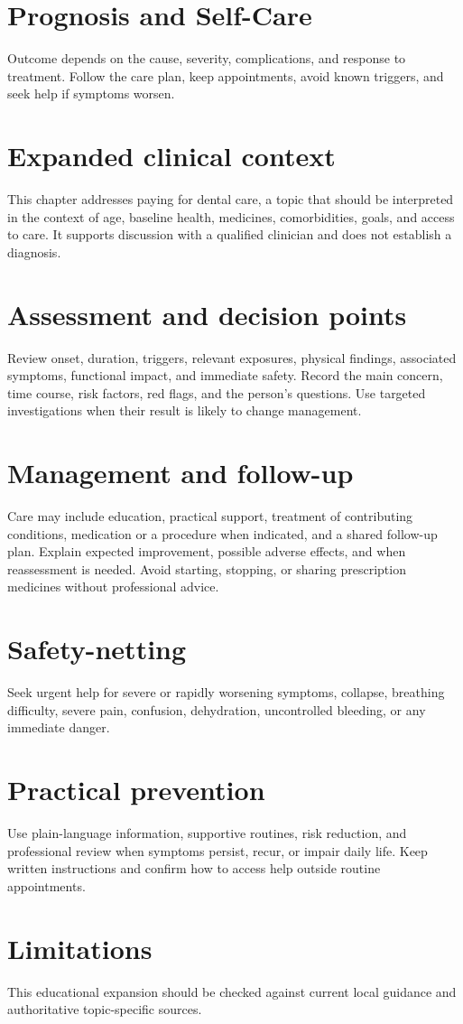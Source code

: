 \section*{Prognosis and Self-Care}
Outcome depends on the cause, severity, complications, and response to treatment. Follow the care plan, keep appointments, avoid known triggers, and seek help if symptoms worsen.

\section*{Expanded clinical context}
This chapter addresses paying for dental care, a topic that should be interpreted in the context of age, baseline health, medicines, comorbidities, goals, and access to care. It supports discussion with a qualified clinician and does not establish a diagnosis.

\section*{Assessment and decision points}
Review onset, duration, triggers, relevant exposures, physical findings, associated symptoms, functional impact, and immediate safety. Record the main concern, time course, risk factors, red flags, and the person’s questions. Use targeted investigations when their result is likely to change management.

\section*{Management and follow-up}
Care may include education, practical support, treatment of contributing conditions, medication or a procedure when indicated, and a shared follow-up plan. Explain expected improvement, possible adverse effects, and when reassessment is needed. Avoid starting, stopping, or sharing prescription medicines without professional advice.

\section*{Safety-netting}
Seek urgent help for severe or rapidly worsening symptoms, collapse, breathing difficulty, severe pain, confusion, dehydration, uncontrolled bleeding, or any immediate danger.

\section*{Practical prevention}
Use plain-language information, supportive routines, risk reduction, and professional review when symptoms persist, recur, or impair daily life. Keep written instructions and confirm how to access help outside routine appointments.

\section*{Limitations}
This educational expansion should be checked against current local guidance and authoritative topic-specific sources.
\clearpage
